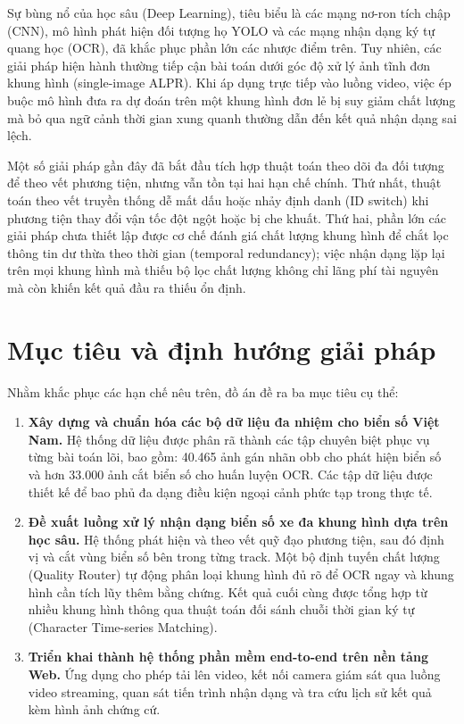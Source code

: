 \documentclass[../DoAn.tex]{subfiles}
\begin{document}
Sự bùng nổ của học sâu (Deep Learning), tiêu biểu là các mạng nơ-ron tích chập (CNN), mô hình phát hiện đối tượng họ YOLO và các mạng nhận dạng ký tự quang học (OCR), đã khắc phục phần lớn các nhược điểm trên. Tuy nhiên, các giải pháp hiện hành thường tiếp cận bài toán dưới góc độ xử lý ảnh tĩnh đơn khung hình (single-image ALPR). Khi áp dụng trực tiếp vào luồng video, việc ép buộc mô hình đưa ra dự đoán trên một khung hình đơn lẻ bị suy giảm chất lượng mà bỏ qua ngữ cảnh thời gian xung quanh thường dẫn đến kết quả nhận dạng sai lệch.

Một số giải pháp gần đây đã bắt đầu tích hợp thuật toán theo dõi đa đối tượng để theo vết phương tiện, nhưng vẫn tồn tại hai hạn chế chính. Thứ nhất, thuật toán theo vết truyền thống dễ mất dấu hoặc nhảy định danh (ID switch) khi phương tiện thay đổi vận tốc đột ngột hoặc bị che khuất. Thứ hai, phần lớn các giải pháp chưa thiết lập được cơ chế đánh giá chất lượng khung hình để chắt lọc thông tin dư thừa theo thời gian (temporal redundancy); việc nhận dạng lặp lại trên mọi khung hình mà thiếu bộ lọc chất lượng không chỉ lãng phí tài nguyên mà còn khiến kết quả đầu ra thiếu ổn định.

\section{Mục tiêu và định hướng giải pháp}
\label{section:1.3}
Nhằm khắc phục các hạn chế nêu trên, đồ án đề ra ba mục tiêu cụ thể:

\begin{enumerate}
    \item \textbf{Xây dựng và chuẩn hóa các bộ dữ liệu đa nhiệm cho biển số Việt Nam.} Hệ thống dữ liệu được phân rã thành các tập chuyên biệt phục vụ từng bài toán lõi, bao gồm: 40.465 ảnh gán nhãn \gls{obb} cho phát hiện biển số và hơn 33.000 ảnh cắt biển số cho huấn luyện OCR. Các tập dữ liệu được thiết kế để bao phủ đa dạng điều kiện ngoại cảnh phức tạp trong thực tế.

    \item \textbf{Đề xuất luồng xử lý nhận dạng biển số xe đa khung hình dựa trên học sâu.} Hệ thống phát hiện và theo vết quỹ đạo phương tiện, sau đó định vị và cắt vùng biển số bên trong từng track. Một bộ định tuyến chất lượng (Quality Router) tự động phân loại khung hình đủ rõ để OCR ngay và khung hình cần tích lũy thêm bằng chứng. Kết quả cuối cùng được tổng hợp từ nhiều khung hình thông qua thuật toán đối sánh chuỗi thời gian ký tự (Character Time-series Matching).

    \item \textbf{Triển khai thành hệ thống phần mềm end-to-end trên nền tảng Web.} Ứng dụng cho phép tải lên video, kết nối camera giám sát qua luồng video streaming, quan sát tiến trình nhận dạng và tra cứu lịch sử kết quả kèm hình ảnh chứng cứ.
\end{enumerate}
\end{document}
